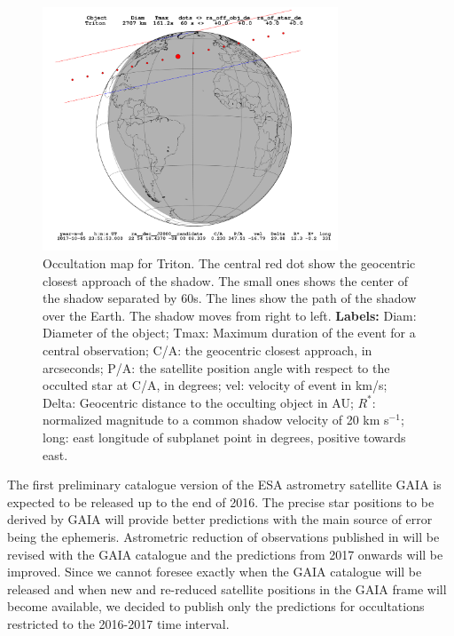 \documentclass[useAMS,usenatbib]{mn2e}
\begin{document}
\begin{figure}
\begin{centering}
\includegraphics[width = 8.8cm]{figures/Triton_2017-10-05T23:51:53.png}   
\caption{Occultation map for Triton.%
The central red dot show the geocentric closest approach of the shadow. The small ones shows the center of the shadow separated by 60s. The lines show the path of the shadow over the Earth. The shadow moves from right to left.
\textbf{Labels:} Diam: Diameter of the object; Tmax: Maximum duration of the event for a central observation; C/A: the geocentric closest approach, in arcseconds; P/A: the satellite position angle with respect to the occulted star at C/A, in degrees; vel: velocity of event in km/s; Delta: Geocentric distance to the occulting object in AU; $R^*$: normalized magnitude to a common shadow velocity of 20 km s$^{-1}$; long: east longitude of subplanet point in degrees, positive towards east.}
\label{Fig: ocultacao}
\end{centering}
\end{figure}

The first preliminary catalogue version of the ESA astrometry satellite GAIA \citep{deBruijne2012} is expected to be released up to the end of 2016. The precise star positions to be derived by GAIA will provide better predictions with the main source of error being the ephemeris. Astrometric reduction of observations published in \cite{GomesJunior2015} will be revised with the GAIA catalogue and the predictions from 2017 onwards will be improved. Since we cannot foresee exactly when the GAIA catalogue will be released and when new and re-reduced satellite positions in the GAIA frame will become available, we decided to publish only the predictions for occultations restricted to the 2016-2017 time interval.
\end{document}
